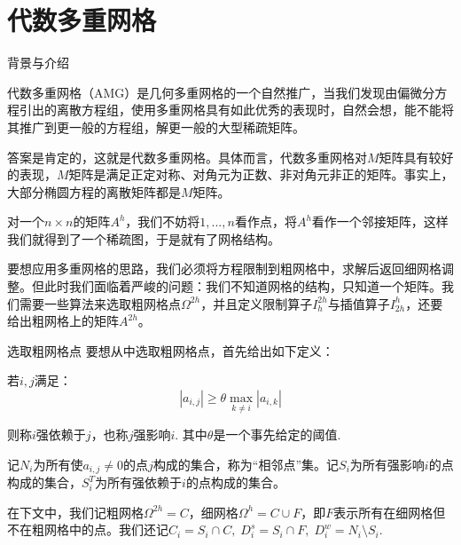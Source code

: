 \documentclass[9pt]{beamer}
\begin{document}
\section{代数多重网格}

\begin{frame}{背景与介绍}

代数多重网格（AMG）是几何多重网格的一个自然推广，当我们发现由偏微分方程引出的离散方程组，使用多重网格具有如此优秀的表现时，自然会想，能不能将其推广到更一般的方程组，解更一般的大型稀疏矩阵。

\pause
\vspace{1em}
答案是肯定的，这就是代数多重网格。具体而言，代数多重网格对$M$矩阵具有较好的表现，$M$矩阵是满足正定对称、对角元为正数、非对角元非正的矩阵。事实上，大部分椭圆方程的离散矩阵都是$M$矩阵。

\pause
\vspace{1em}
对一个$n\times n$的矩阵$A^h$，我们不妨将$1,...,n$看作点，将$A^h$看作一个邻接矩阵，这样我们就得到了一个稀疏图，于是就有了网格结构。

\pause
\vspace{1em}
要想应用多重网格的思路，我们必须将方程限制到粗网格中，求解后返回细网格调整。但此时我们面临着严峻的问题：我们不知道网格的结构，只知道一个矩阵。我们需要一些算法来选取粗网格点$\Omega^{2h}$，并且定义限制算子$I_{h}^{2h}$与插值算子$I_{2h}^{h}$，还要给出粗网格上的矩阵$A^{2h}$。
\end{frame}

\begin{frame}{选取粗网格点}
要想从中选取粗网格点，首先给出如下定义：

\vspace{1em}
  若$i,j$满足：
  \begin{equation}
    |a_{i,j}|\geq \theta\max_{k\neq i}|a_{i,k}|
  \end{equation}

  则称$i$强依赖于$j$，也称$j$强影响$i$. 其中$\theta$是一个事先给定的阈值.

 \vspace{.5em}
  记$N_i$为所有使$a_{i,j}\neq 0$的点$j$构成的集合，称为“相邻点”集。记$S_i$为所有强影响$i$的点构成的集合，$S_i^T$为所有强依赖于$i$的点构成的集合。

\vspace{1em}
在下文中，我们记粗网格$\Omega^{2h}=C$，细网格$\Omega^h=C\cup F$，即$F$表示所有在细网格但不在粗网格中的点。我们还记$C_i=S_i\cap C,\;D_i^s=S_i\cap F,\;D_i^w=N_i\setminus S_i$.
\end{frame}
\end{document}

